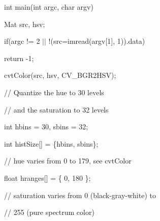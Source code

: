 {\ttfamily }

{\ttfamily }

{\ttfamily int main(int argc, char argv)}

{\ttfamily }

{\ttfamily }

{\ttfamily Mat src, hsv;}

{\ttfamily }

{\ttfamily }

{\ttfamily if(argc != 2 $\vert$$\vert$ !(src=imread(argv\mbox{[}1\mbox{]}, 1)).data)}

{\ttfamily }

{\ttfamily }

{\ttfamily return -\/1;}

{\ttfamily }

{\ttfamily }

{\ttfamily cvt\+Color(src, hsv, C\+V\+\_\+\+B\+G\+R2\+H\+S\+V);}

{\ttfamily }

{\ttfamily }

{\ttfamily // Quantize the hue to 30 levels}

{\ttfamily }

{\ttfamily }

{\ttfamily // and the saturation to 32 levels}

{\ttfamily }

{\ttfamily }

{\ttfamily int hbins = 30, sbins = 32;}

{\ttfamily }

{\ttfamily }

{\ttfamily int hist\+Size\mbox{[}\mbox{]} = \{hbins, sbins\};}

{\ttfamily }

{\ttfamily }

{\ttfamily // hue varies from 0 to 179, see cvt\+Color}

{\ttfamily }

{\ttfamily }

{\ttfamily float hranges\mbox{[}\mbox{]} = \{ 0, 180 \};}

{\ttfamily }

{\ttfamily }

{\ttfamily // saturation varies from 0 (black-\/gray-\/white) to}

{\ttfamily }

{\ttfamily }

{\ttfamily // 255 (pure spectrum color)}

{\ttfamily }

